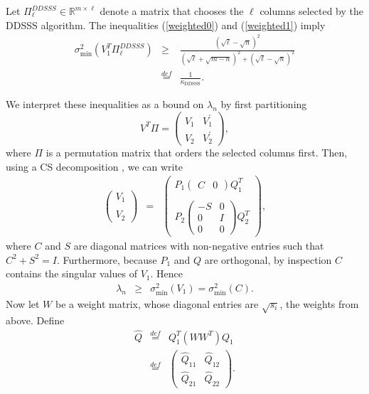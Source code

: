 \documentclass[final,leqno,onefignum,onetabnum]{siamltex1213}
\begin{document}
\begin{theorem}\label{bnd:old}
Let $\Pi_{\ell}^{DDSSS}\in\mathbb{R}^{m\times\ell}$ denote a matrix that chooses the $\ell$ columns selected by the DDSSS algorithm.  The inequalities (\ref{weighted0}) and (\ref{weighted1}) imply
\begin{eqnarray}
\sigma^2_{\min}\left(V_1^T \Pi_{\ell}^{DDSSS}\right)&\ge&\frac{\left(\sqrt{\ell}-\sqrt{n}\right)^2}{\left(\sqrt{\ell}+\sqrt{m-n}\right)^2+\left(\sqrt{\ell}-\sqrt{n}\right)^2}\nonumber\\
&\stackrel{def}=&\frac{1}{\kappa_{\text{DDSSS}}}.\nonumber
\end{eqnarray}
\end{theorem}
\proof
We interpret these inequalities as a bound on $\lambda_n$ by first partitioning
$$V^T\Pi=\left(\begin{array}{cc} V_1 & V_1^\prime \\ V_2 & V_2^\prime\end{array}\right),$$
where $\Pi$ is a permutation matrix that orders the selected columns first. Then, using a CS decomposition \cite{loan}, we can write
\begin{eqnarray}
\left(\begin{array}{c} V_1 \\ \\ V_2\end{array}\right)&=&\left(\begin{array}{c}P_1\left(\begin{array}{cc} C & 0\end{array}\right)Q_1^T\\ \\ P_2\left(\begin{array}{cc} -S & 0\\ 0 & I \\ 0 & 0\end{array}\right)Q_2^T\end{array}\right),\nonumber
\end{eqnarray}
where $C$ and $S$ are diagonal matrices with non-negative entries such that $C^2+S^2=I$.  Furthermore, because $P_1$ and $Q$ are orthogonal, by inspection $C$ contains the singular values of $V_1$.  Hence
\begin{eqnarray}
\lambda_n&\ge&\sigma_{\min}^2\left(V_1\right)=\sigma_{\min}^2(C).\nonumber
\end{eqnarray}
Now let $W$ be a weight matrix, whose diagonal entries are $\sqrt{s_i}$, the weights from above.  Define
\begin{eqnarray}
\widehat{Q}&\stackrel{def}=&Q_1^T\left(WW^T\right)Q_1\nonumber\\
&\stackrel{def}=&\left(\begin{array}{cc}\widehat{Q}_{11} & \widehat{Q}_{12} \\ \widehat{Q}_{21} & \widehat{Q}_{22}\end{array}\right).\nonumber
\end{eqnarray}
\end{document}
